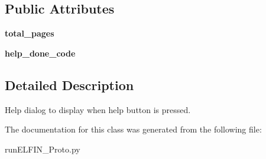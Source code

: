 \subsection*{Public Attributes}
\begin{DoxyCompactItemize}
\item 
\hypertarget{classrunELFIN__Proto_1_1HelpDialog_a51a912a78cbd4e7d2246873f4b15974f}{{\bfseries total\-\_\-pages}}\label{classrunELFIN__Proto_1_1HelpDialog_a51a912a78cbd4e7d2246873f4b15974f}

\item 
\hypertarget{classrunELFIN__Proto_1_1HelpDialog_aca88e773346b803b15fc06f179bbbe12}{{\bfseries help\-\_\-done\-\_\-code}}\label{classrunELFIN__Proto_1_1HelpDialog_aca88e773346b803b15fc06f179bbbe12}

\end{DoxyCompactItemize}


\subsection{Detailed Description}
Help dialog to display when help button is pressed. 

The documentation for this class was generated from the following file\-:\begin{DoxyCompactItemize}
\item 
run\-E\-L\-F\-I\-N\-\_\-\-Proto.\-py\end{DoxyCompactItemize}
